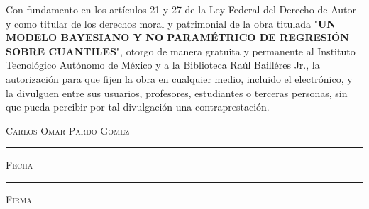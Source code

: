 \thispagestyle{empty}
\vspace*{\fill}
\begingroup
Con fundamento en los art\'iculos 21 y 27 de la Ley Federal del Derecho de Autor y como titular de los derechos moral y patrimonial de la obra titulada "\textbf{UN MODELO BAYESIANO Y NO PARAM\'ETRICO DE REGRESI\'ON SOBRE CUANTILES}", otorgo de manera gratuita y permanente al Instituto Tecnol\'ogico Aut\'onomo de M\'exico y a la Biblioteca Ra\'ul Baill\'eres Jr., la autorizaci\'on para que fijen la obra en cualquier medio, incluido el electr\'onico, y la divulguen entre sus usuarios, profesores, estudiantes o terceras personas, sin que pueda percibir por tal divulgaci\'on una contraprestaci\'on.

\centering

\hspace{3em}

\textsc{Carlos Omar Pardo Gomez}

\vspace{4em}

\rule[1em]{20em}{0.5pt} %

\textsc{Fecha}
 
\vspace{6em}

\rule[1em]{20em}{0.5pt} %

\textsc{Firma}

\endgroup
\vspace*{\fill}